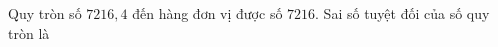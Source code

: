 \begin{ex}
Quy tròn số $7216{,}4$ đến hàng đơn vị được số $7216$. Sai số tuyệt đối của số quy tròn là
\end{ex}

